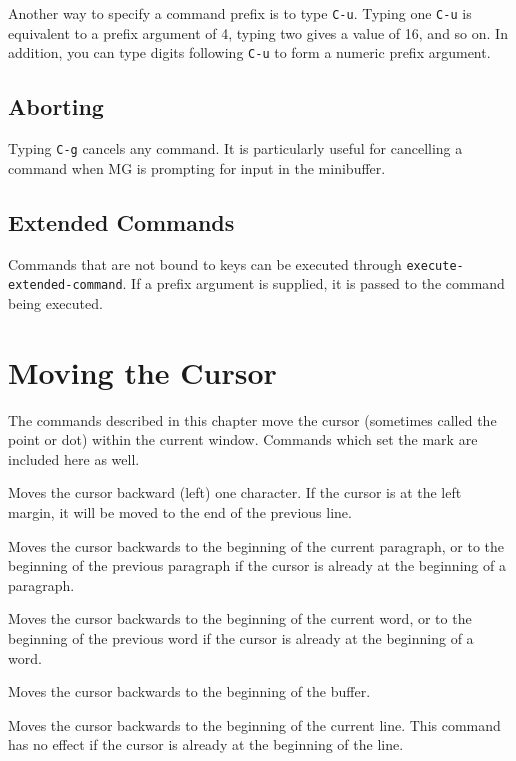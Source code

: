 \fbody Another way to specify a command prefix is to type {\tt C-u}.
Typing one {\tt C-u} is equivalent to a prefix argument of 4, typing
two gives a value of 16, and so on.  In addition, you can type digits
following {\tt C-u} to form a numeric prefix argument.

\section{Aborting}

\fbody Typing {\tt C-g} cancels any command.  It is particularly useful
for cancelling a command when MG is prompting for input in the minibuffer.

\section{Extended Commands}

\fbody Commands that are not bound to keys can be executed through 
{\tt execute-extended-command}.  If a prefix argument is supplied, it
is passed to the command being executed.


\chapter{Moving the Cursor}

The commands described in this chapter move the cursor (sometimes
called the point or dot) within the current window.  Commands which
set the mark are included here as well.

\fbody Moves the cursor backward (left) one character.  If the cursor
is at the left margin, it will be moved to the end of the previous line.

\fname{backward-paragraph}{}{M-[}
\fbody Moves the cursor backwards to the beginning of the current
paragraph, or to the beginning of the previous paragraph if the cursor
is already at the beginning of a paragraph.

\fbody Moves the cursor backwards to the beginning of the current word,
or to the beginning of the previous word if the cursor is already at
the beginning of a word.

\fbody Moves the cursor backwards to the beginning of the buffer.

\fbody Moves the cursor backwards to the beginning of the current
line.  This command has no effect if the cursor is already at the beginning
of the line.

